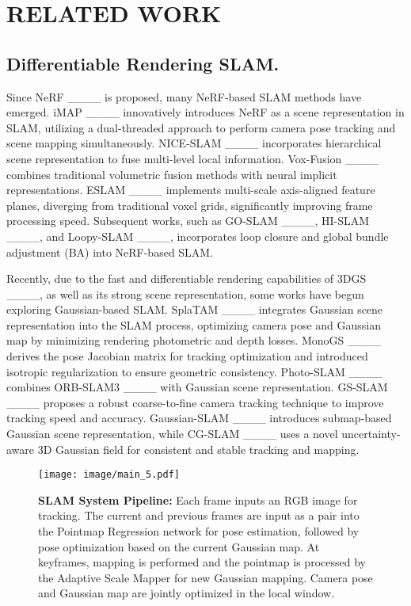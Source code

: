 \section{RELATED WORK}
\subsection{Differentiable Rendering SLAM.} 
Since NeRF ____ is proposed, many NeRF-based SLAM methods have emerged. iMAP ____ innovatively introduces NeRF as a scene representation in SLAM, utilizing a dual-threaded approach to perform camera pose tracking and scene mapping simultaneously. NICE-SLAM ____ incorporates hierarchical scene representation to fuse multi-level local information. Vox-Fusion ____ combines traditional volumetric fusion methods with neural implicit representations. ESLAM ____ implements multi-scale axis-aligned feature planes, diverging from traditional voxel grids, significantly improving frame processing speed. Subsequent works, such as GO-SLAM ____, HI-SLAM ____, and Loopy-SLAM ____, incorporates loop closure and global bundle adjustment (BA) into NeRF-based SLAM.

Recently, due to the fast and differentiable rendering capabilities of 3DGS ____, as well as its strong scene representation, some works have begun exploring Gaussian-based SLAM. SplaTAM ____ integrates Gaussian scene representation into the SLAM process, optimizing camera pose and Gaussian map by minimizing rendering photometric and depth losses. MonoGS ____ derives the pose Jacobian matrix for tracking optimization and introduced isotropic regularization to ensure geometric consistency. Photo-SLAM ____ combines ORB-SLAM3 ____ with Gaussian scene representation. GS-SLAM ____ proposes a robust coarse-to-fine camera tracking technique to improve tracking speed and accuracy. Gaussian-SLAM ____ introduces submap-based Gaussian scene representation, while CG-SLAM ____ uses a novel uncertainty-aware 3D Gaussian field for consistent and stable tracking and mapping.

\begin{figure*}
    \centering
    \texttt{[image: image/main\_5.pdf]}
    \caption{\textbf{SLAM System Pipeline:} Each frame inputs an RGB image for tracking. The current and previous frames are input as a pair into the Pointmap Regression network for pose estimation, followed by pose optimization based on the current Gaussian map. At keyframes, mapping is performed and the pointmap is processed by the Adaptive Scale Mapper for new Gaussian mapping. Camera pose and Gaussian map are jointly optimized in the local window.}
    \label{main}
\vspace{-15pt}
\end{figure*}

